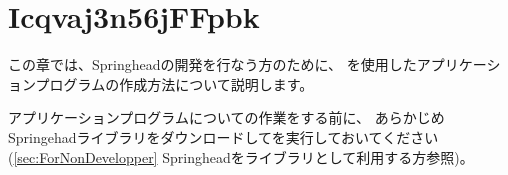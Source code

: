 \newpage
\section{Icqvaj3n56jFFpbk}
\label{sec:ForDevelopper}

\noindent
\KLUDGE この章では、Springhead\KLUDGE の開発を行なう方のために、
\cmake \KLUDGE を使用したアプリケーションプログラムの作成方法について説明します。

\medskip
\noindent
\KLUDGE アプリケーションプログラムについての作業をする前に、
\KLUDGE あらかじめSpringehad\KLUDGE ライブラリをダウンロードして\cmake \KLUDGE を実行しておいてください
(\KQuoteS\ref{sec:ForNonDevelopper} Springhead\KLUDGE をライブラリとして利用する方\KQuoteE \KLUDGE 参照)\KLUDGE 。

